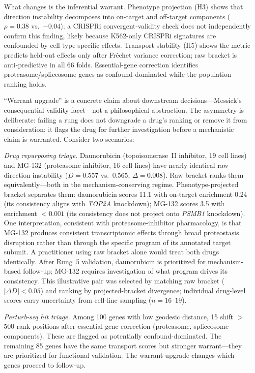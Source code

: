 \documentclass[11pt]{article}
\begin{document}
What changes is the inferential warrant. Phenotype projection (H3) shows
that direction instability decomposes into on-target and off-target
components ($\rho = 0.38$ vs.\ $-0.04$); a CRISPRi convergent-validity
check does not independently confirm this finding, likely because
K562-only CRISPRi signatures are confounded by cell-type-specific
effects. Transport stability (H5) shows
the metric predicts held-out effects only after Fr\'{e}chet variance
correction; raw bracket is anti-predictive in all 66 folds. Essential-gene
correction identifies proteasome/spliceosome genes as confound-dominated
while the population ranking holds.

``Warrant upgrade'' is a concrete claim about downstream decisions---Messick's
consequential validity facet---not a philosophical abstraction. The asymmetry
is deliberate: failing a
rung does not downgrade a drug's ranking or remove it from consideration;
it flags the drug for further investigation before a mechanistic claim
is warranted. Consider two scenarios:

\emph{Drug repurposing triage.} Daunorubicin (topoisomerase~II inhibitor,
19 cell lines) and MG-132 (proteasome inhibitor, 16 cell lines) have
nearly identical raw direction instability ($D = 0.557$ vs.\ $0.565$,
$\Delta = 0.008$). Raw bracket ranks them equivalently---both in the
mechanism-conserving regime. Phenotype-projected bracket separates them:
daunorubicin scores 11.1 with on-target enrichment 0.24 (its consistency
aligns with \emph{TOP2A} knockdown); MG-132 scores 3.5 with enrichment
$< 0.001$ (its consistency does not project onto \emph{PSMB1} knockdown).
One interpretation, consistent with proteasome-inhibitor pharmacology, is
that MG-132 produces consistent transcriptomic effects through broad
proteostasis disruption rather than through the specific program of its
annotated target subunit. A practitioner using raw bracket alone would
treat both drugs identically. After Rung~5 validation, daunorubicin is
prioritized for mechanism-based follow-up; MG-132 requires investigation
of what program drives its consistency. This illustrative pair was selected
by matching raw bracket ($|\Delta D| < 0.05$) and ranking by projected-bracket
divergence; individual drug-level scores carry uncertainty from cell-line
sampling ($n = 16$--$19$).

\emph{Perturb-seq hit triage.} Among 100 genes with low geodesic
distance, 15 shift $>$500 rank positions after essential-gene correction
(proteasome, spliceosome components). These are flagged as potentially
confound-dominated. The remaining 85 genes have the same transport
scores but stronger warrant---they are prioritized for functional
validation. The warrant upgrade changes which genes proceed to follow-up.
\end{document}
